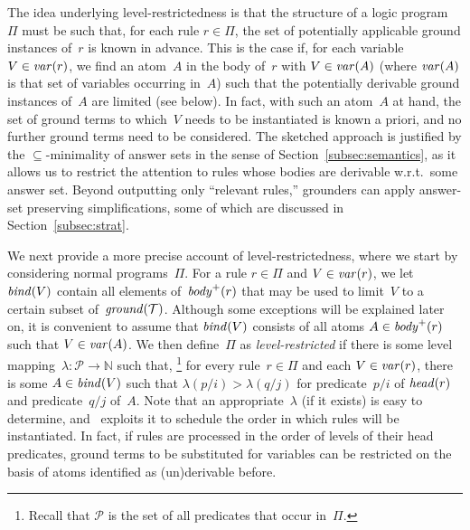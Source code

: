 The idea underlying level-restrictedness is that the structure of a logic program~$\Pi$
must be such that, for each rule $r\in\Pi$,
the set of potentially applicable ground instances of~$r$ is known in advance.
This is the case if, for each variable~$V\in\vars{r}$,
we find an atom~$A$ in the body of~$r$ with
$V\in\vars{A}$ (where $\vars{A}$ is that set of variables occurring in~$A$)
such that the potentially derivable ground instances of~$A$ are limited (see below).
In fact, with such an atom~$A$ at hand,
the set of ground terms to which~$V$ needs to be instantiated is known a priori,
and no further ground terms need to be considered.
The sketched approach is justified by the $\subseteq$-minimality of answer sets
in the sense of Section~\ref{subsec:semantics},
as it allows us to restrict the attention to rules whose bodies are derivable w.r.t.\
some answer set.
Beyond outputting only ``relevant rules,''
grounders can apply answer-set preserving simplifications,
some of which are discussed in Section~\ref{subsec:strat}.

We next provide a more precise account of level-restrictedness,
where we start by considering normal programs~$\Pi$.
For a rule $r\in\Pi$ and $V\in\vars{r}$,
we let $\binders{V}{r}$ contain all elements of~$\pbody{r}$ that may be used to
limit~$V$ to a certain subset of~$\ground{\mathcal{T}}$.
Although some exceptions will be explained later on,
it is convenient to assume that $\binders{V}{r}$ consists of all atoms $A\in\pbody{r}$
such that $V\in\vars{A}$.
We then %
define~$\Pi$ as \emph{level-restricted}
if there is some level mapping~$\lambda:\mathcal{P}\rightarrow\mathbb{N}$ such that,%
\footnote{Recall that $\mathcal{P}$ is the set of all predicates that occur in~$\Pi$.}
for every rule~$r\in\Pi$ and each $V\in\vars{r}$,
there is some $A\in\binders{V}{r}$ such that $\lambda(p/i)>\lambda(q/j)$
for predicate~$p/i$ of $\head{r}$ and predicate~$q/j$ of~$A$.
Note that an appropriate~$\lambda$ (if it exists) is easy to determine,
and \gringo\ exploits it to schedule the order in which rules will be instantiated.
In fact, if rules are processed in the order of levels of their head predicates,
ground  terms to be substituted for variables can be restricted
on the basis of atoms identified as (un)derivable before.

